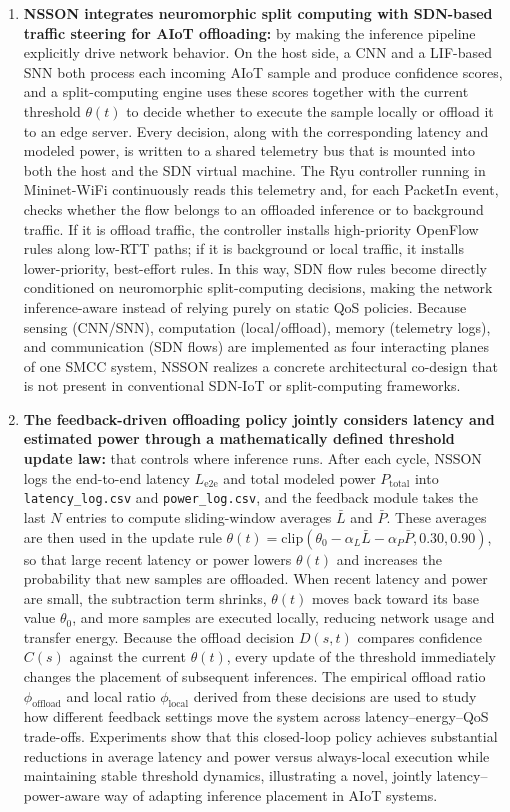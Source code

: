 \documentclass[journal]{IEEEtran}
\begin{document}
\begin{enumerate}
\item  \textbf{NSSON integrates neuromorphic split computing with SDN-based traffic steering for AIoT offloading:} by making the inference pipeline explicitly drive network behavior. On the host side, a CNN and a LIF-based SNN both process each incoming AIoT sample and produce confidence scores, and a split-computing engine uses these scores together with the current threshold $\theta(t)$ to decide whether to execute the sample locally or offload it to an edge server. Every decision, along with the corresponding latency and modeled power, is written to a shared telemetry bus that is mounted into both the host and the SDN virtual machine. The Ryu controller running in Mininet-WiFi continuously reads this telemetry and, for each PacketIn event, checks whether the flow belongs to an offloaded inference or to background traffic. If it is offload traffic, the controller installs high-priority OpenFlow rules along low-RTT paths; if it is background or local traffic, it installs lower-priority, best-effort rules. In this way, SDN flow rules become directly conditioned on neuromorphic split-computing decisions, making the network inference-aware instead of relying purely on static QoS policies. Because sensing (CNN/SNN), computation (local/offload), memory (telemetry logs), and communication (SDN flows) are implemented as four interacting planes of one SMCC system, NSSON realizes a concrete architectural co-design that is not present in conventional SDN-IoT or split-computing frameworks. 
\item  \textbf{The feedback-driven offloading policy jointly considers latency and estimated power through a mathematically defined threshold update law:} that controls where inference runs. After each cycle, NSSON logs the end-to-end latency $L_{\text{e2e}}$ and total modeled power $P_{\text{total}}$ into \texttt{latency\_log.csv} and \texttt{power\_log.csv}, and the feedback module takes the last $N$ entries to compute sliding-window averages $\bar{L}$ and $\bar{P}$. These averages are then used in the update rule $\theta(t) = \mathrm{clip}\!\left(\theta_0 - \alpha_L \bar{L} - \alpha_P \bar{P}, 0.30, 0.90\right)$, so that large recent latency or power lowers $\theta(t)$ and increases the probability that new samples are offloaded. When recent latency and power are small, the subtraction term shrinks, $\theta(t)$ moves back toward its base value $\theta_0$, and more samples are executed locally, reducing network usage and transfer energy. Because the offload decision $D(s,t)$ compares confidence $C(s)$ against the current $\theta(t)$, every update of the threshold immediately changes the placement of subsequent inferences. The empirical offload ratio $\phi_{\text{offload}}$ and local ratio $\phi_{\text{local}}$ derived from these decisions are used to study how different feedback settings move the system across latency–energy–QoS trade-offs. Experiments show that this closed-loop policy achieves substantial reductions in average latency and power versus always-local execution while maintaining stable threshold dynamics, illustrating a novel, jointly latency–power-aware way of adapting inference placement in AIoT systems.
\end{enumerate}
\end{document}
